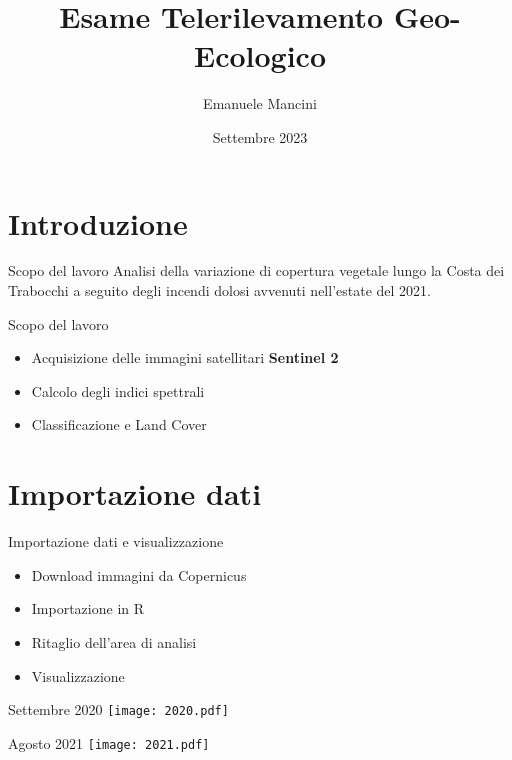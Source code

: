 \documentclass{beamer}
\title{Esame Telerilevamento Geo-Ecologico}
\author{Emanuele Mancini}
\institute{\large Alma Mater Studiorum - Università di Bologna}
\date{Settembre 2023}
\begin{document}
\maketitle

\section{Introduzione}

\begin{frame}{Scopo del lavoro}
Analisi della variazione di copertura vegetale lungo la Costa dei Trabocchi a seguito degli incendi dolosi avvenuti nell'estate del 2021.
\end{frame}

\begin{frame}{Scopo del lavoro}
\begin{itemize}
    \item Acquisizione delle immagini satellitari \textbf{Sentinel 2}
    \item \pause Calcolo degli indici spettrali
    \item \pause Classificazione e Land Cover
\end{itemize}    
\end{frame}

\section{Importazione dati}

\begin{frame}{Importazione dati e visualizzazione}
\begin{itemize}
    \item Download immagini da Copernicus
    \item \pause Importazione in R
    \item \pause Ritaglio dell'area di analisi
    \item \pause Visualizzazione
\end{itemize}
    
\end{frame}

\begin{frame}{Settembre 2020}
\centering
\texttt{[image: 2020.pdf]}
\end{frame}

\begin{frame}{Agosto 2021}
\centering
\texttt{[image: 2021.pdf]}
\end{frame}
\end{document}
